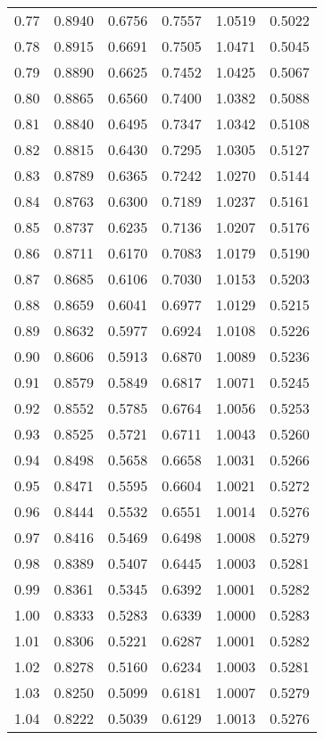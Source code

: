 \documentclass{article}
\begin{document}
\begin{longtable}{cccccc}
0.77 & 0.8940 & 0.6756 & 0.7557 & 1.0519 & 0.5022 \\
0.78 & 0.8915 & 0.6691 & 0.7505 & 1.0471 & 0.5045 \\
0.79 & 0.8890 & 0.6625 & 0.7452 & 1.0425 & 0.5067 \\
0.80 & 0.8865 & 0.6560 & 0.7400 & 1.0382 & 0.5088 \\
0.81 & 0.8840 & 0.6495 & 0.7347 & 1.0342 & 0.5108 \\
0.82 & 0.8815 & 0.6430 & 0.7295 & 1.0305 & 0.5127 \\
0.83 & 0.8789 & 0.6365 & 0.7242 & 1.0270 & 0.5144 \\
0.84 & 0.8763 & 0.6300 & 0.7189 & 1.0237 & 0.5161 \\
0.85 & 0.8737 & 0.6235 & 0.7136 & 1.0207 & 0.5176 \\
0.86 & 0.8711 & 0.6170 & 0.7083 & 1.0179 & 0.5190 \\
0.87 & 0.8685 & 0.6106 & 0.7030 & 1.0153 & 0.5203 \\
0.88 & 0.8659 & 0.6041 & 0.6977 & 1.0129 & 0.5215 \\
0.89 & 0.8632 & 0.5977 & 0.6924 & 1.0108 & 0.5226 \\
0.90 & 0.8606 & 0.5913 & 0.6870 & 1.0089 & 0.5236 \\
0.91 & 0.8579 & 0.5849 & 0.6817 & 1.0071 & 0.5245 \\
0.92 & 0.8552 & 0.5785 & 0.6764 & 1.0056 & 0.5253 \\
0.93 & 0.8525 & 0.5721 & 0.6711 & 1.0043 & 0.5260 \\
0.94 & 0.8498 & 0.5658 & 0.6658 & 1.0031 & 0.5266 \\
0.95 & 0.8471 & 0.5595 & 0.6604 & 1.0021 & 0.5272 \\
0.96 & 0.8444 & 0.5532 & 0.6551 & 1.0014 & 0.5276 \\
0.97 & 0.8416 & 0.5469 & 0.6498 & 1.0008 & 0.5279 \\
0.98 & 0.8389 & 0.5407 & 0.6445 & 1.0003 & 0.5281 \\
0.99 & 0.8361 & 0.5345 & 0.6392 & 1.0001 & 0.5282 \\
1.00 & 0.8333 & 0.5283 & 0.6339 & 1.0000 & 0.5283 \\
1.01 & 0.8306 & 0.5221 & 0.6287 & 1.0001 & 0.5282 \\
1.02 & 0.8278 & 0.5160 & 0.6234 & 1.0003 & 0.5281 \\
1.03 & 0.8250 & 0.5099 & 0.6181 & 1.0007 & 0.5279 \\
1.04 & 0.8222 & 0.5039 & 0.6129 & 1.0013 & 0.5276 \\

\end{longtable}
\end{document}
